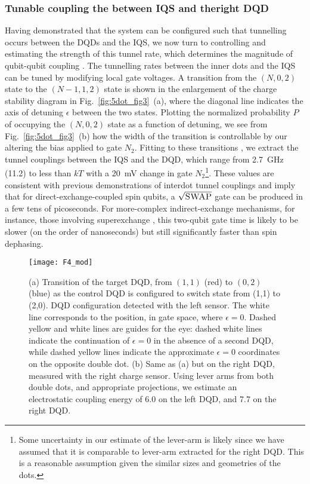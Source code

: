 \subsubsection{Tunable coupling the between IQS and theright DQD}
Having demonstrated that the system can be configured such that tunnelling occurs between the DQDs and the IQS, we now turn to controlling and estimating the strength of this tunnel rate, which determines the magnitude of qubit-qubit coupling \cite{bluhm,nnano.2016.188,PhysRevLett.114.226803}. The tunnelling rates between the inner dots and the IQS can be tuned by modifying local gate voltages. A transition from the $(N,0,2)$ state to the $(N-1,1,2)$ state is shown in the enlargement of the charge stability diagram in Fig.~\ref{fig:5dot_fig3}~(a), where the diagonal line indicates the axis of detuning $\epsilon$ between the two states. Plotting the normalized probability $P$ of occupying the $(N,0,2)$ state as a function of detuning, we see from Fig.~\ref{fig:5dot_fig3}~(b) how the width of the transition is controllable by our altering the bias applied to gate $N_2$. Fitting to these transitions \cite{PhysRevLett.92.226801}, we extract the tunnel couplings between the IQS and the DQD, which range from \SI{2.7}{\giga\hertz} (\SI{11.2}{\uev}) to less than $kT$ with a \SI{20}{\milli\volt} change in gate $N_2$\footnote{Some uncertainty in our estimate of the lever-arm is likely since we have assumed that it is comparable to lever-arm extracted for the right DQD. This is a reasonable assumption given the similar sizes and geometries of the dots.}. These values are consistent with previous demonstrations of interdot tunnel couplings \cite{nnano.2016.188,petta} and imply that for direct-exchange-coupled spin qubits, a $\sqrt{\textsc{SWAP}}$ gate can be produced in a few tens of picoseconds. For more-complex indirect-exchange mechanisms, for instance, those involving superexchange \cite{bluhm,nnano.2016.188}, this two-qubit gate time is likely to be slower (on the order of nanoseconds) but still significantly faster than spin dephasing.

\begin{figure}
\texttt{[image: F4\_mod]}
\caption[Capacative coupling between DQDs via an IQS]{\label{fig:5dot_fig4} (a) Transition of the target DQD, from $(1,1)$ (red) to $(0,2)$ (blue) as the control DQD is configured to switch state from (1,1) to (2,0). DQD configuration detected with the left sensor. The white line corresponds to the position, in gate space, where $\epsilon = 0$. Dashed yellow and white lines are guides for the eye: dashed white lines indicate the continuation of $\epsilon = 0$ in the absence of a second DQD, while dashed yellow lines indicate the approximate $\epsilon = 0$ coordinates on the opposite double dot.  (b)  Same as (a) but on the right DQD, measured with the right charge sensor. Using lever arms from both double dots, and appropriate projections, we estimate an electrostatic coupling energy of \SI{6.0}{\uev} on the left DQD, and \SI{7.7}{\uev} on the right DQD.}
\end{figure}

